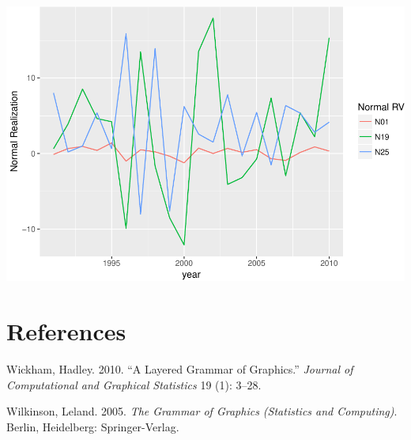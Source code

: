 \documentclass[12pt,]{article}
\begin{document}
\includegraphics{Intro_graphics_files/figure-latex/wide_vs_long-2.pdf}

\section*{References}\label{references}

\hypertarget{refs}{}
\hypertarget{ref-Wickham:2010}{}
Wickham, Hadley. 2010. ``A Layered Grammar of Graphics.'' \emph{Journal
of Computational and Graphical Statistics} 19 (1): 3--28.

\hypertarget{ref-Wilkinson:2005}{}
Wilkinson, Leland. 2005. \emph{The Grammar of Graphics (Statistics and
Computing)}. Berlin, Heidelberg: Springer-Verlag.
\end{document}
